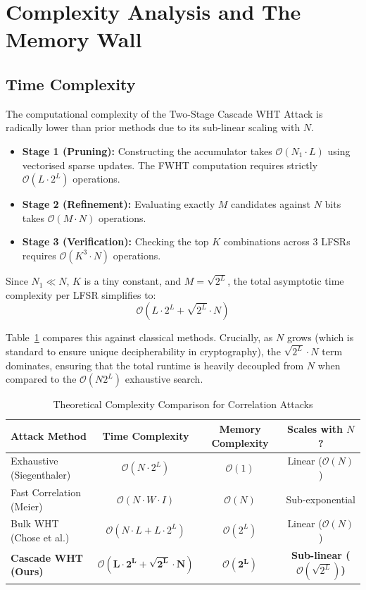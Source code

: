 \section{Complexity Analysis and The Memory Wall}
\label{sec:complexity}

\subsection{Time Complexity}
The computational complexity of the Two-Stage Cascade WHT Attack is radically lower than prior methods due to its sub-linear scaling with $N$. 

\begin{itemize}
    \item \textbf{Stage 1 (Pruning):} Constructing the accumulator takes $\mathcal{O}(N_1 \cdot L)$ using vectorised sparse updates. The FWHT computation requires strictly $\mathcal{O}(L \cdot 2^L)$ operations.
    \item \textbf{Stage 2 (Refinement):} Evaluating exactly $M$ candidates against $N$ bits takes $\mathcal{O}(M \cdot N)$ operations.
    \item \textbf{Stage 3 (Verification):} Checking the top $K$ combinations across 3 LFSRs requires $\mathcal{O}(K^3 \cdot N)$ operations.
\end{itemize}

Since $N_1 \ll N$, $K$ is a tiny constant, and $M = \sqrt{2^L}$, the total asymptotic time complexity per LFSR simplifies to:
\begin{equation}
    \mathcal{O}\left(L \cdot 2^L + \sqrt{2^L} \cdot N\right)
\end{equation}

Table~\ref{tab:complexity_comparison} compares this against classical methods. Crucially, as $N$ grows (which is standard to ensure unique decipherability in cryptography), the $\sqrt{2^L} \cdot N$ term dominates, ensuring that the total runtime is heavily decoupled from $N$ when compared to the $\mathcal{O}(N 2^L)$ exhaustive search.

\begin{table}[h]
\centering
\caption{Theoretical Complexity Comparison for Correlation Attacks}
\label{tab:complexity_comparison}
\begin{tabular}{@{}lccc@{}}
\toprule
\textbf{Attack Method} & \textbf{Time Complexity} & \textbf{Memory Complexity} & \textbf{Scales with $N$?} \\ \midrule
Exhaustive (Siegenthaler) & $\mathcal{O}(N \cdot 2^L)$ & $\mathcal{O}(1)$ & Linear ($\mathcal{O}(N)$) \\
Fast Correlation (Meier) & $\mathcal{O}(N \cdot W \cdot I)$ & $\mathcal{O}(N)$ & Sub-exponential \\
Bulk WHT (Chose et al.) & $\mathcal{O}(N \cdot L + L \cdot 2^L)$ & $\mathcal{O}(2^L)$ & Linear ($\mathcal{O}(N)$) \\
\textbf{Cascade WHT (Ours)} & $\mathbf{\mathcal{O}(L \cdot 2^L + \sqrt{2^L} \cdot N)}$ & $\mathbf{\mathcal{O}(2^L)}$ & \textbf{Sub-linear ($\mathcal{O}(\sqrt{2^L})$)} \\ \bottomrule
\end{tabular}
\end{table}

